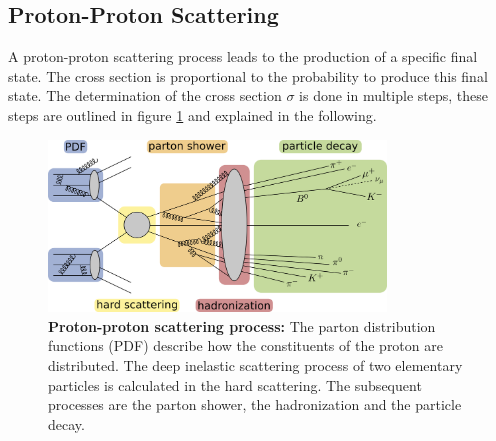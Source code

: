 \subsection{Proton-Proton Scattering}
A proton-proton scattering process leads to the production of a specific final state. The cross section is proportional to the probability to produce this final state. The determination of the cross section $\sigma$ is done in multiple steps, these steps are outlined in figure \ref{fig:ch_3_scattering} and explained in the following.

\begin{figure}
\centering
\includegraphics[width=0.8\textwidth]{chapter_3_gen/scattering.png}
\caption[Proton-Proton Scattering Process]{\textbf{Proton-proton scattering process:} The parton distribution functions (PDF) describe how the constituents of the proton are distributed. The deep inelastic scattering process of two elementary particles is calculated in the hard scattering. The subsequent processes are the parton shower, the hadronization and the particle decay.}
\label{fig:ch_3_scattering}
\end{figure}

